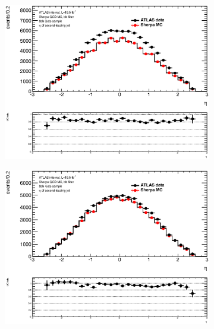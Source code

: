 \begin{figure}[phtb!]
  \begin{center}
  \begin{subfigure}[$bbb$ 3 jet category]{0.3\textwidth}\includegraphics[width=\textwidth]{MonteCarlo/figures/eta1_bbb_3jets.eps}\end{subfigure}
  \begin{subfigure}[$bbb$ 4 jet category]{0.3\textwidth}\includegraphics[width=\textwidth]{MonteCarlo/figures/eta1_bbb_4jets.eps}\end{subfigure}

\end{center}
\end{figure}
